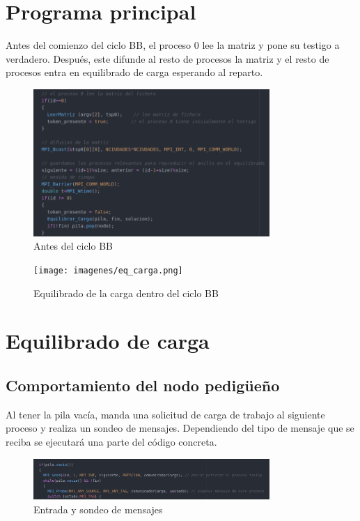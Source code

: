 \section{Programa principal}

Antes del comienzo del ciclo BB, el proceso 0 lee la matriz y pone su testigo a verdadero. Después, este difunde al resto de procesos la matriz y el resto de procesos entra en equilibrado de carga esperando al reparto.

\begin{figure}[H]
\centering
\includegraphics[width=0.8\textwidth]{imagenes/inicio.png}
\caption{Antes del ciclo BB}
\end{figure}


\begin{figure}[H]
\centering
\texttt{[image: imagenes/eq\_carga.png]}
\caption{Equilibrado de la carga dentro del ciclo BB}
\end{figure}

\section{Equilibrado de carga}

\subsection{Comportamiento del nodo pedigüeño}

Al tener la pila vacía, manda una solicitud de carga de trabajo al siguiente proceso y realiza un sondeo de mensajes. Dependiendo del tipo de mensaje que se reciba se ejecutará una parte del código concreta.

\begin{figure}[H]
\centering
\includegraphics[width=0.8\textwidth]{imagenes/pila.png}
\caption{Entrada y sondeo de mensajes}
\end{figure}

